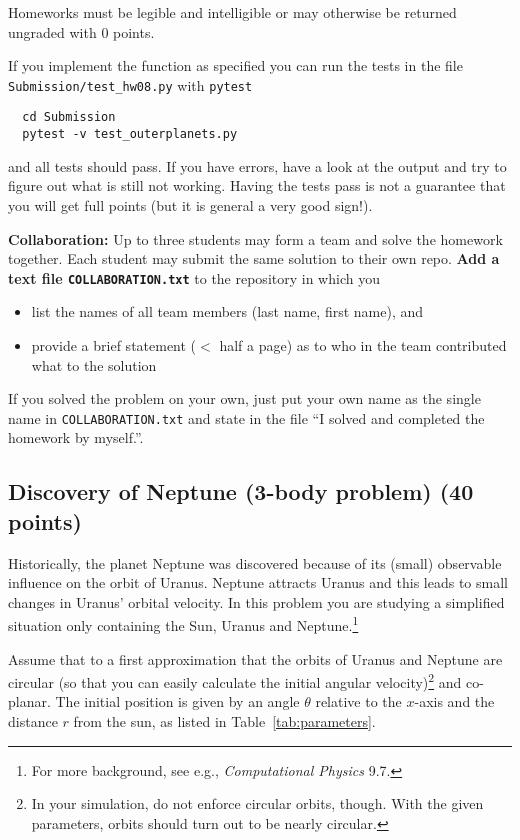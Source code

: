 \documentclass[letterpaper]{scrartcl}
\begin{document}
Homeworks must be legible and intelligible or may otherwise be
returned ungraded with 0 points.

If you implement the function as specified you can run the tests in
the file \texttt{Submission/test\_hw08.py} with \texttt{pytest}
\begin{verbatim}
  cd Submission
  pytest -v test_outerplanets.py
\end{verbatim}
and all tests should pass. If you have errors, have a look at the
output and try to figure out what is still not working. Having the
tests pass is not a guarantee that you will get full points (but it is
general a very good sign!).

\textbf{Collaboration:} Up to three students may form a team and solve
the homework together. Each student may submit the same solution to
their own repo. \textbf{Add a text file \texttt{COLLABORATION.txt}} to
the repository in which you
\begin{itemize}
\item list the names of all team members (last name, first name), and
\item provide a brief statement ($<$ half a page) as to who in the
  team contributed what to the solution
\end{itemize}
If you solved the problem on your own, just put your own name as the
single name in \texttt{COLLABORATION.txt} and state in the file ``I
solved and completed the homework by myself.''.

\subsection{Discovery of Neptune (3-body problem) (40 points)}
\label{sec:neptune}
Historically, the planet Neptune was discovered because of its (small)
observable influence on the orbit of Uranus. Neptune attracts Uranus
and this leads to small changes in Uranus' orbital velocity. In this
problem you are studying a simplified situation only containing the
Sun, Uranus and Neptune.\footnote{For more background, see e.g.,
  \emph{Computational Physics} 9.7.}

Assume that to a first approximation that the orbits of Uranus and
Neptune are circular (so that you can easily calculate the initial
angular velocity)\footnote{In your simulation, do not enforce circular
orbits, though. With the given parameters, orbits should turn out to
be nearly circular.} and co-planar. The initial position is given by
an angle $\theta$ relative to the $x$-axis and the distance $r$ from
the sun, as listed in Table~\ref{tab:parameters}.
\end{document}
